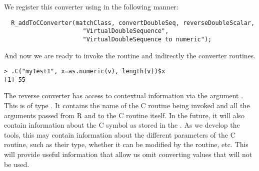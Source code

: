\documentclass{article}
\begin{document}
We register this converter using 
in the following manner:
\begin{verbatim}
  R_addToCConverter(matchClass, convertDoubleSeq, reverseDoubleScalar, 
                      "VirtualDoubleSequence", 
                      "VirtualDoubleSequence to numeric");
\end{verbatim}

And now we are ready to invoke the  routine
and indirectly the converter routines.
\begin{verbatim}
> .C("myTest1", x=as.numeric(v), length(v))$x
[1] 55
\end{verbatim}



The reverse converter has access to contextual information via the
argument .  This is of type .  It
contains the name of the C routine being invoked and all the arguments
passed from R and to the C routine itself.  In the future, it will
also contain information about the C symbol as stored in the
. As we develop the tools, this may contain information
about the different parameters of the C routine, such as their type,
whether it can be modified by the routine, etc.  This will provide
useful information that allow us omit converting values that will not
be used.
\end{document}
